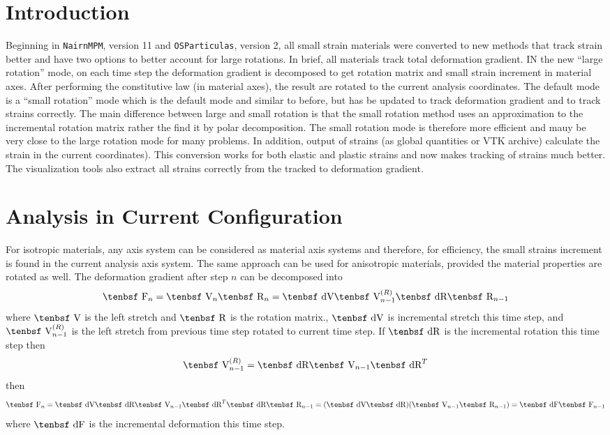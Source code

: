 \documentclass[11pt]{book}
\def\F{\hbox{\tenbsf F}}
\def\dF{\hbox{\tenbsf dF}}
\def\R{\hbox{\tenbsf R}}
\def\dR{\hbox{\tenbsf dR}}
\def\V{\hbox{\tenbsf V}}
\def\dV{\hbox{\tenbsf dV}}
\begin{document}
\section{Introduction}

Beginning in {\tt NairnMPM}, version 11 and {\tt OSParticulas}, version 2, all small strain materials were converted to new methods that track strain better and have two options to better account for large rotations. In brief, all materials track total deformation gradient. IN the new ``large rotation'' mode, on each time step the deformation gradient is decomposed to get rotation matrix and small strain increment in material axes. After performing the constitutive law (in material axes), the result are rotated to the current analysis coordinates. The default mode is a ``small rotation'' mode which is the default mode and similar to before, but has be updated to track deformation gradient and to track strains correctly. The main difference between large and small rotation is that the small rotation method uses an approximation to the incremental rotation matrix rather the find it by polar decomposition. The small rotation mode is therefore more efficient and mauy be very close to the large rotation mode for many problems. In addition, output of strains (as global quantities or VTK archive) calculate the strain in the current coordinates). This conversion works for both elastic and plastic strains and now makes tracking of strains much better. The visualization tools also extract all strains correctly from the tracked to deformation gradient.

\section{Analysis in Current Configuration}

For isotropic materials, any axis system can be considered as material axis systems and therefore, for efficiency, the small strains increment is found in the current analysis axis system. The same approach can be used for anisotropic materials, provided the material properties are rotated as well. The deformation gradient after step $n$ can be decomposed into
\begin{equation}
   \F_n = \V_n\R_n = \dV \V_{n-1}^{(R)} \dR \R_{n-1}
\end{equation}
where $\V$ is the left stretch and $\R$ is the rotation matrix., $\dV$ is incremental stretch this time step, and $\V_{n-1}^{(R)} $ is the left stretch from previous time step rotated to current time step. If $\dR$ is the incremental rotation this time step then
\begin{equation}
    \V_{n-1}^{(R)} =  \dR \V_{n-1} \dR^T
\end{equation}
then
\begin{equation}
   \F_n =  \dV \dR \V_{n-1} \dR^T \dR \R_{n-1} = (\dV\dR)(\V_{n-1}  \R_{n-1}) = \dF \F_{n-1}
\end{equation}
where $\dF$ is the incremental deformation this time step.
\end{document}
